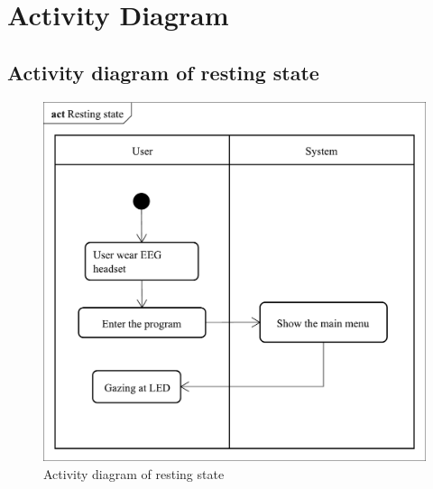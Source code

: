 \section{Activity Diagram}
\subsection{Activity diagram of resting state}
\begin{figure}[ht]
	\centering
	\includegraphics[scale = 0.295]{chapter4/Rest.pdf}
	\caption{Activity diagram of resting state}
\end{figure}

